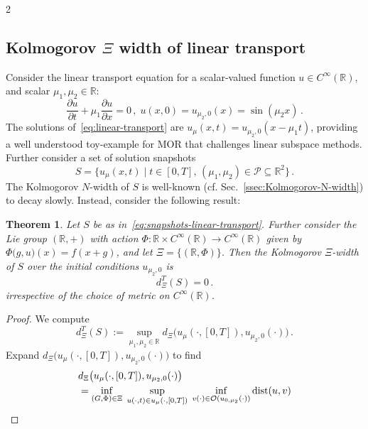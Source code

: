 \documentclass{article}
\newtheorem{theorem}{Theorem}[section]
\newtheorem{proof}{Proof}[theorem]
\newcommand{\R}{\mathbb{R}}                                 %
\newcommand{\der}[2][3]{\frac{\partial{#1}}{\partial{#2}}}
\begin{document}
\begin{multicols}{2}
\subsection{Kolmogorov $\Xi$ width of linear transport}\label{ssec:linear-transport}
Consider the linear transport equation for a scalar-valued function $u \in C^\infty(\R)$, and scalar $\mu_1,\mu_2 \in \R$:
\begin{equation}\label{eq:linear-transport}
    \der[u]{t} + \mu_1\der[u]{x} = 0\,,\; u(x,0) = u_{\mu_2,0}(x) = \sin(\mu_2 x) \,.
\end{equation}
The solutions of~\eqref{eq:linear-transport} are $u_\mu(x,t) = u_{\mu_2,0}(x-\mu_1 t)$, providing a well understood toy-example for MOR that challenges linear subspace methods. Further consider a set of solution snapshots
\begin{equation}\label{eq:snapshots-linear-transport}
    S = \{ u_\mu(x,t) \;|\; t \in [0,T],\, (\mu_1,\mu_2) \in \mathcal{P} \subseteq \R^2\}\,.
\end{equation}
The Kolmogorov $N$-width of $S$ is well-known (cf. Sec.~\ref{ssec:Kolmogorov-N-width}) to decay slowly. Instead, consider the following result:
\begin{theorem}
    Let $S$ be as in~\eqref{eq:snapshots-linear-transport}. Further consider the Lie group $(\R,+)$ with action $\Phi:\R\times C^\infty(\R)\rightarrow C^\infty(\R)$ given by $\Phi\big(g,u\big)(x) = f(x+g)$, and let $\Xi = \{(\R,\Phi)\}$. Then the Kolmogorov $\Xi$-width of $S$ over the initial conditions $u_{\mu_2,0}$ is 
    \begin{equation}
        d^T_\Xi(S) = 0\,.
    \end{equation}
    irrespective of the choice of metric on $C^\infty(\R)$.
\end{theorem}
\begin{proof}
    We compute
    \begin{equation}
        d^T_{\Xi}(S) := \sup_{\mu_1,\mu_2 \in \R} d_{\Xi}\big(u_{\mu}(\cdot,[0,T]),u_{\mu_2,0}(\cdot)\big)\,.
    \end{equation}
    Expand $d_{\Xi}\big(u_{\mu}(\cdot,[0,T]),u_{\mu_2,0}(\cdot)\big)$ to find
    \begin{align}
        &d_{\Xi}\big(u_{\mu}(\cdot,[0,T]),u_{\mu_2,0}(\cdot)\big) \\
        &=\inf_{\substack{(G,\Phi) \in \Xi}}\; \sup_{u(\cdot,t) \in u_{\mu}(\cdot,[0,T])}\; \inf_{v(\cdot) \in \mathcal{O}(u_{0,\mu_2}(\cdot))} \textnormal{dist}(u,v)\nonumber\\ 

\end{align}
\end{proof}
\end{multicols}
\end{document}
